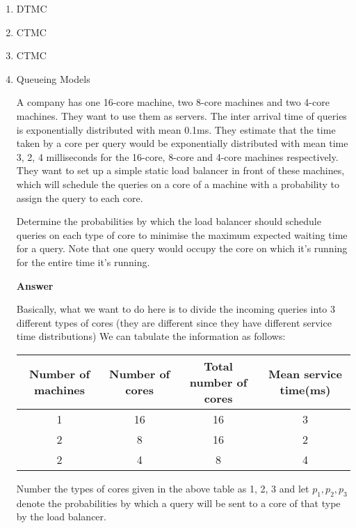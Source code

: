 \documentclass[12pt, oneside]{article}
\begin{document}
\begin{enumerate}
\item DTMC

\item CTMC


\item CTMC


\item {
    Queueing Models

    A company has one 16-core machine, two 8-core machines and two 4-core machines. They want
    to use them as servers. The inter arrival time of queries is exponentially distributed
    with mean 0.1ms. They estimate that the time taken by a core per query
    would be exponentially distributed with mean time 3, 2, 4 milliseconds for the 16-core,
    8-core and 4-core machines respectively. They want to set up a simple static load 
    balancer in front of these machines, which will schedule the queries on a core of a 
    machine with a probability to assign the query to each core.

    Determine the probabilities by which the load balancer should schedule queries on each
    type of core to minimise the maximum expected waiting time for a query. Note that one 
    query would occupy the core on which it's running for the entire time it's running.

    \textbf{Answer}

    Basically, what we want to do here is to divide the incoming queries into 3 different
    types of cores (they are different since they have different service time distributions)
    We can tabulate the information as follows:

    \begin{center}
        \begin{tabular}{| c | c | c | c |}
            \hline
            Number of machines & Number of cores & Total number of cores & Mean service time(ms) \\
            \hline
            1 & 16 & 16 & 3 \\
            2 & 8 & 16 & 2 \\
            2 & 4 & 8 & 4 \\
            \hline
        \end{tabular}
    \end{center}

    Number the types of cores given in the above table as 1, 2, 3 and let \(p_1, p_2, p_3\)
    denote the probabilities by which a query will be sent to a core of that type by the load
    balancer.

}
\end{enumerate}
\end{document}
